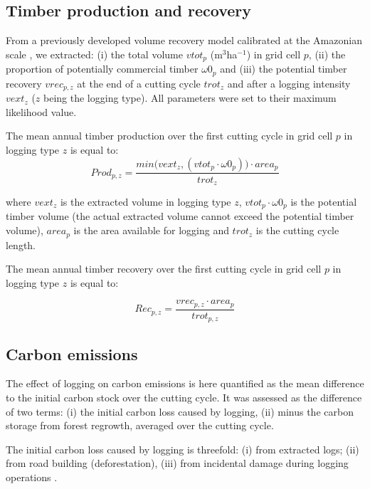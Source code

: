 \documentclass{article}
\begin{document}
\subsection{Timber production and recovery}

From a previously developed volume recovery model calibrated at the Amazonian scale \cite{Piponiot2019}, we extracted: (i) the total volume $vtot_p$ (m$^3$ha$^{-1}$) in grid cell $p$, (ii) the proportion of potentially commercial timber $\omega 0_p$ and (iii) the potential timber recovery $vrec_{p,z}$ at the end of a cutting cycle $trot_z$ and after a logging intensity $vext_z$ ($z$ being the logging type). All parameters were set to their maximum likelihood value.

The mean annual timber production over the first cutting cycle in grid cell $p$ in logging type $z$ is equal to: 
\begin{equation}
\label{eq:prod}
    Prod_{p,z}  =  \frac{min\big(vext_z, (vtot_p\cdot \omega 0_p) \big) \cdot area_p}{trot_z}
\end{equation}

where $vext_z$ is the extracted volume in logging type $z$, $vtot_p\cdot \omega 0_p$ is the potential timber volume (the actual extracted volume cannot exceed the potential timber volume), $area_p$ is the area available for logging and $trot_z$ is the cutting cycle length.

The mean annual timber recovery over the first cutting cycle in grid cell $p$ in logging type $z$ is equal to: 

\begin{equation}
\label{eq:rec}
    Rec_{p,z} = \frac{vrec_{p,z}\cdot area_p}{trot_{p,z}}
\end{equation}

\subsection{Carbon emissions}

The effect of logging on carbon emissions is here quantified as the mean difference to the initial carbon stock over the cutting cycle. It was assessed as the difference of two terms: (i) the initial carbon loss caused by logging, (ii) minus the carbon storage from forest regrowth, averaged over the cutting cycle. 

The initial carbon loss caused by logging is threefold: (i) from extracted logs; (ii) from road building (deforestation), (iii) from incidental damage during logging operations \cite{Piponiot2016}. 
\end{document}
